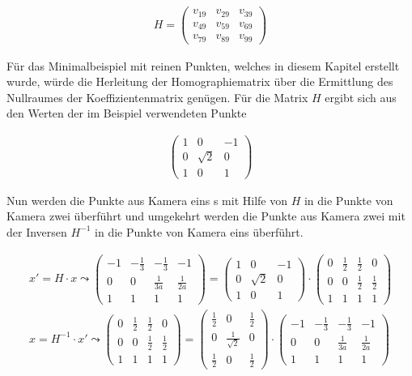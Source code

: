 \begin{gather}
	H=
	\begin{pmatrix}
	v_{19}&v_{29}&v_{39}\\
	v_{49}&v_{59}&v_{69}\\
	v_{79}&v_{89}&v_{99}
	\end{pmatrix}
\end{gather}

Für das Minimalbeispiel mit reinen Punkten, welches in diesem Kapitel erstellt wurde, würde die Herleitung der Homographiematrix über die Ermittlung des Nullraumes der Koeffizientenmatrix genügen. Für die Matrix $H$ ergibt sich aus den Werten der im Beispiel verwendeten Punkte

\begin{gather}
	\begin{pmatrix}
	1&0&-1\\
	0&\sqrt{2}&0\\
	1&0&1
	\end{pmatrix}
\end{gather}

Nun werden die Punkte aus Kamera eins s mit Hilfe von $H$ in die Punkte von Kamera zwei überführt und umgekehrt werden die Punkte aus Kamera zwei mit der Inversen $H^{-1}$ in die Punkte von Kamera eins überführt. 

\begin{gather}
x'=H \cdot x \leadsto 
	\begin{pmatrix}
	-1&-\frac{1}{3}&-\frac{1}{3}&-1\\
	0&0&\frac{1}{3a}&\frac{1}{2a}\\
	1&1&1&1
\end{pmatrix}= 	\begin{pmatrix}
1&0&-1\\
0&\sqrt{2}&0\\
1&0&1
\end{pmatrix}
\cdot
\begin{pmatrix}
0&\frac{1}{2}&\frac{1}{2}&0\\
0&0&\frac{1}{2}&\frac{1}{2}\\
1&1&1&1
\end{pmatrix}\\
x=H^{-1} \cdot x' \leadsto 
\begin{pmatrix}
0&\frac{1}{2}&\frac{1}{2}&0\\
0&0&\frac{1}{2}&\frac{1}{2}\\
1&1&1&1
\end{pmatrix}
= 	\begin{pmatrix}
\frac{1}{2}&0&\frac{1}{2}\\
0&\frac{1}{\sqrt{2}}&0\\
\frac{1}{2}&0&\frac{1}{2}
\end{pmatrix}
\cdot
\begin{pmatrix}
-1&-\frac{1}{3}&-\frac{1}{3}&-1\\
0&0&\frac{1}{3a}&\frac{1}{2a}\\
1&1&1&1
\end{pmatrix}
\end{gather}

